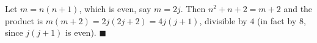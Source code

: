 Let $m=n(n+1)$, which is even, say $m=2j$. Then $n^2+n+2=m+2$ and the product is $m(m+2)=2j(2j+2)=4j(j+1)$, divisible by $4$ (in fact by $8$, since $j(j+1)$ is even). $\blacksquare$
